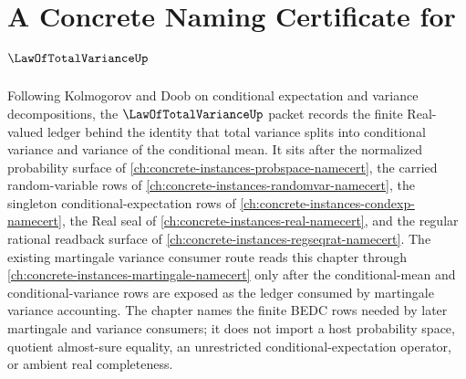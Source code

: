 \chapter{A Concrete Naming Certificate for $\LawOfTotalVarianceUp$}
\label{ch:concrete-instances-law-of-total-variance-namecert}

Following Kolmogorov and Doob on conditional expectation and variance decompositions, the $\LawOfTotalVarianceUp$ packet records the finite Real-valued ledger behind the identity that total variance splits into conditional variance and variance of the conditional mean. It sits after the normalized probability surface of \autoref{ch:concrete-instances-probspace-namecert}, the carried random-variable rows of \autoref{ch:concrete-instances-randomvar-namecert}, the singleton conditional-expectation rows of \autoref{ch:concrete-instances-condexp-namecert}, the Real seal of \autoref{ch:concrete-instances-real-namecert}, and the regular rational readback surface of \autoref{ch:concrete-instances-regseqrat-namecert}. The existing martingale variance consumer route reads this chapter through \autoref{ch:concrete-instances-martingale-namecert} only after the conditional-mean and conditional-variance rows are exposed as the ledger consumed by martingale variance accounting. The chapter names the finite BEDC rows needed by later martingale and variance consumers; it does not import a host probability space, quotient almost-sure equality, an unrestricted conditional-expectation operator, or ambient real completeness.

